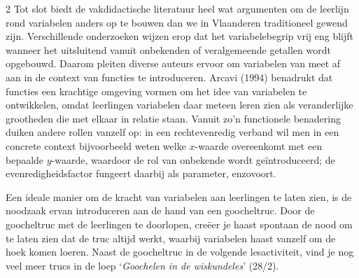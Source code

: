 \begin{multicols}{2}
Tot slot biedt de vakdidactische literatuur heel wat argumenten om de leerlijn rond variabelen anders op te bouwen dan we in Vlaanderen traditioneel gewend zijn. Verschillende onderzoeken wijzen erop dat het variabelebegrip vrij eng blijft wanneer het uitsluitend vanuit onbekenden of veralgemeende getallen wordt opgebouwd. Daarom pleiten diverse auteurs ervoor om variabelen van meet af aan in de context van functies te introduceren. Arcavi (1994) benadrukt dat functies een krachtige omgeving vormen om het idee van variabelen te ontwikkelen, omdat leerlingen variabelen daar meteen leren zien als veranderlijke grootheden die met elkaar in relatie staan. Vanuit zo’n functionele benadering duiken andere rollen vanzelf op: in een rechtevenredig verband wil men in een concrete context bijvoorbeeld weten welke $x$-waarde overeenkomt met een bepaalde $y$-waarde, waardoor de rol van onbekende wordt geïntroduceerd; de evenredigheidsfactor fungeert daarbij als parameter, enzovoort.

Een ideale manier om de kracht van variabelen aan leerlingen te laten zien, is de noodzaak ervan introduceren aan de hand van een goocheltruc. Door de goocheltruc met de leerlingen te doorlopen, creëer je haast spontaan de nood om te laten zien dat de truc altijd werkt, waarbij variabelen haast vanzelf om de hoek komen loeren. Naast de goocheltruc in de volgende lesactiviteit, vind je nog veel meer trucs in de loep `\textit{Goochelen in de wiskundeles}' (28/2).
\end{multicols}
